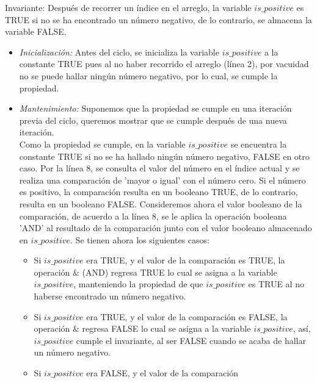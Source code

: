 \documentclass[a4paper, 12pt]{report}
\begin{document}
\begin{enumerate}
{\begin{enumerate}
    Invariante: Después de recorrer un índice en el arreglo, la variable
    $is\_positive$ es TRUE si no se ha encontrado un número negativo, de lo
    contrario, se almacena la variable FALSE.
    \begin{itemize}
        \item {\it Inicialización:}
            Antes del ciclo, se inicializa la variable $is\_positive$ a la
            constante TRUE pues al no haber recorrido el arreglo (línea 2), por
            vacuidad
            no se puede hallar ningún número negativo, por lo cual, se cumple
            la propiedad.
        \item {\it Mantenimiento:}
            Suponemos que la propiedad se cumple en una iteración previa del
            ciclo, queremos mostrar que se cumple después de una nueva
            iteración.\\
            Como la propiedad se cumple, en la variable $is\_positive$ se
            encuentra la constante TRUE si no se ha hallado ningún número
            negativo, FALSE en otro caso. Por la línea 8, se consulta el valor
            del número en el índice actual y se realiza una comparación de
            'mayor o igual' con el número cero. Si el número es positivo, la
            comparación resulta en un booleano TRUE, de lo contrario, resulta
            en un booleano FALSE. Consideremos ahora el valor booleano de la
            comparación, de acuerdo a la línea 8, se le aplica la operación
            booleana 'AND' al resultado de la comparación junto con el valor
            booleano almacenado en $is\_positive$. Se tienen ahora los
            siguientes casos:
            \begin{itemize}
                \item Si $is\_positive$ era TRUE, y el valor de la comparación
                    es TRUE, la operación $\&$ (AND) regresa TRUE lo cual se
                    asigna a
                    la variable $is\_positive$, manteniendo la
                    propiedad de que $is\_positive$ es TRUE al no haberse encontrado un número negativo.
                \item Si $is\_positive$ era TRUE, y el valor de la comparación
                    es FALSE, la operación $\&$ regresa FALSE lo cual se asigna a
                    la variable $is\_positive$, así, $is\_positive$ cumple
                    el invariante, al ser FALSE cuando se acaba de hallar un
                    número negativo.
                \item Si $is\_positive$ era FALSE, y el valor de la comparación

\end{itemize}
\end{itemize}
\end{enumerate}}
\end{enumerate}
\end{document}
